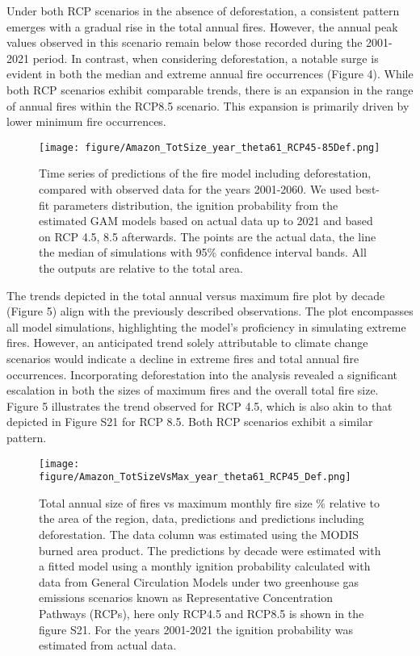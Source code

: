 \documentclass[
]{article}
\begin{document}
Under both RCP scenarios in the absence of deforestation, a consistent
pattern emerges with a gradual rise in the total annual fires. However,
the annual peak values observed in this scenario remain below those
recorded during the 2001-2021 period. In contrast, when considering
deforestation, a notable surge is evident in both the median and extreme
annual fire occurrences (Figure 4). While both RCP scenarios exhibit
comparable trends, there is an expansion in the range of annual fires
within the RCP8.5 scenario. This expansion is primarily driven by lower
minimum fire occurrences.

\begin{figure}
\centering
\texttt{[image: figure/Amazon\_TotSize\_year\_theta61\_RCP45-85Def.png]}
\caption{Time series of predictions of the fire model including
deforestation, compared with observed data for the years 2001-2060. We
used best-fit parameters distribution, the ignition probability from the
estimated GAM models based on actual data up to 2021 and based on RCP
4.5, 8.5 afterwards. The points are the actual data, the line the median
of simulations with 95\% confidence interval bands. All the outputs are
relative to the total area.}
\end{figure}

The trends depicted in the total annual versus maximum fire plot by
decade (Figure 5) align with the previously described observations. The
plot encompasses all model simulations, highlighting the model's
proficiency in simulating extreme fires. However, an anticipated trend
solely attributable to climate change scenarios would indicate a decline
in extreme fires and total annual fire occurrences. Incorporating
deforestation into the analysis revealed a significant escalation in
both the sizes of maximum fires and the overall total fire size. Figure
5 illustrates the trend observed for RCP 4.5, which is also akin to that
depicted in Figure S21 for RCP 8.5. Both RCP scenarios exhibit a similar
pattern.

\begin{figure}
\centering
\texttt{[image: figure/Amazon\_TotSizeVsMax\_year\_theta61\_RCP45\_Def.png]}
\caption{Total annual size of fires vs maximum monthly fire size \%
relative to the area of the region, data, predictions and predictions
including deforestation. The data column was estimated using the MODIS
burned area product. The predictions by decade were estimated with a
fitted model using a monthly ignition probability calculated with data
from General Circulation Models under two greenhouse gas emissions
scenarios known as Representative Concentration Pathways (RCPs), here
only RCP4.5 and RCP8.5 is shown in the figure S21. For the years
2001-2021 the ignition probability was estimated from actual data.}
\end{figure}
\end{document}
